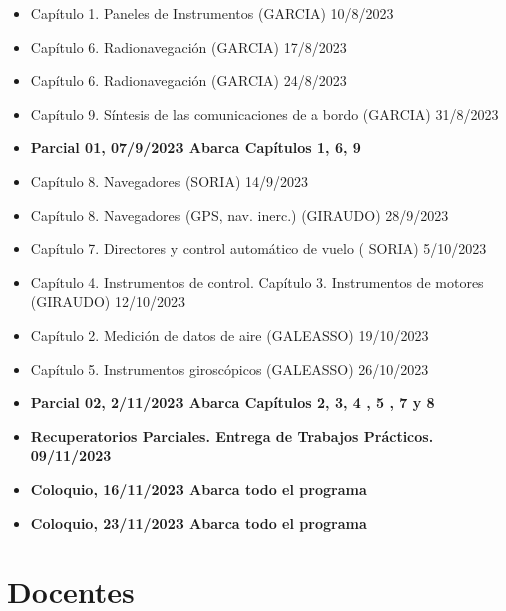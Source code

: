   \begin{itemize}
  \item Capítulo 1. Paneles de Instrumentos (GARCIA) 10/8/2023
  \item Capítulo 6. Radionavegación (GARCIA) 17/8/2023
  \item Capítulo 6. Radionavegación (GARCIA) 24/8/2023    
  \item Capítulo 9. Síntesis de las comunicaciones de a bordo (GARCIA)     31/8/2023
  \item \textbf{Parcial 01,  07/9/2023 Abarca Capítulos 1, 6, 9}

  \item Capítulo 8. Navegadores (SORIA) 14/9/2023
  \item Capítulo 8. Navegadores (GPS, nav. inerc.) (GIRAUDO) 28/9/2023    
    
  \item Capítulo 7. Directores y control automático de vuelo ( SORIA)     5/10/2023
  
    \item Capítulo 4. Instrumentos de control. 
          Capítulo 3. Instrumentos de motores (GIRAUDO) 12/10/2023
  
  \item Capítulo 2. Medición de datos de aire (GALEASSO) 19/10/2023
  \item Capítulo 5. Instrumentos giroscópicos (GALEASSO) 26/10/2023

  \item {\bf Parcial 02,  2/11/2023 Abarca Capítulos 2, 3, 4 , 5 , 7 y 8}

  \item \textbf{Recuperatorios Parciales. Entrega de Trabajos Prácticos. 09/11/2023}

  \item \textbf{Coloquio,  16/11/2023 Abarca todo el programa}
  \item \textbf{Coloquio, 23/11/2023 Abarca todo el programa}
  \end{itemize}


\section*{Docentes}
\label{00.docentes}

